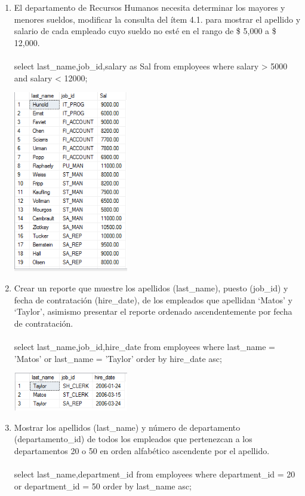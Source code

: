 \begin{enumerate}[1.]
	\item El departamento de Recursos Humanos necesita determinar los mayores y menores sueldos, modificar la consulta del  ítem 4.1. para mostrar el apellido y salario de cada empleado cuyo sueldo no est\'e en el rango de \$ 5,000 a \$ 12,000.
	\\ \\select last\_name,job\_id,salary as Sal from employees where salary > 5000 and salary < 12000;

	\begin{center}
	\includegraphics[width=5cm]{./Imagenes/actividad_04_03} 
	\end{center}

	\item Crear un reporte que muestre los apellidos (last\_name), puesto (job\_id) y fecha de contrataci\'on (hire\_date), de los empleados que apellidan ‘Matos’ y ‘Taylor’, asimismo presentar el reporte ordenado ascendentemente por fecha de contrataci\'on.
	\\ \\select last\_name,job\_id,hire\_date from employees where last\_name = 'Matos' or last\_name = 'Taylor' order by hire\_date asc;

	\begin{center}
	\includegraphics[width=5cm]{./Imagenes/actividad_04_04} 
	\end{center}

	\item Mostrar los apellidos (last\_name) y n\'umero de departamento (departamento\_id) de todos los empleados que pertenezcan a los departamentos 20 o 50 en orden alfab\'etico ascendente por el apellido.
	\\ \\select last\_name,department\_id from employees where department\_id = 20 or department\_id = 50 order by last\_name asc;
	

\end{enumerate}
